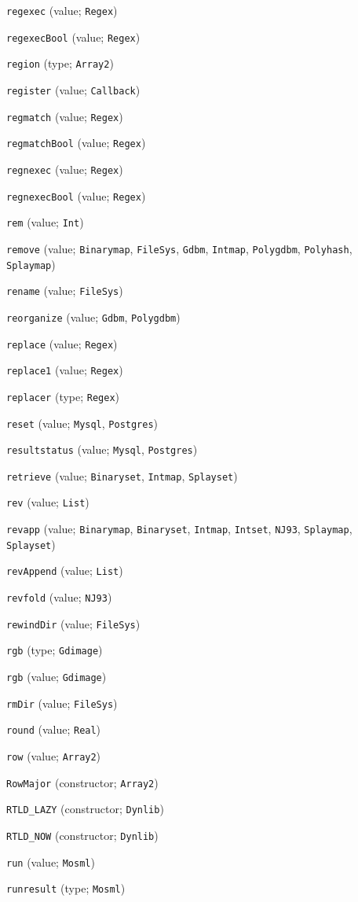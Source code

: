 \begin{description}
\item[] \verb"regexec" (value; \verb"Regex")
\item[] \verb"regexecBool" (value; \verb"Regex")
\item[] \verb"region" (type; \verb"Array2")
\item[] \verb"register" (value; \verb"Callback")
\item[] \verb"regmatch" (value; \verb"Regex")
\item[] \verb"regmatchBool" (value; \verb"Regex")
\item[] \verb"regnexec" (value; \verb"Regex")
\item[] \verb"regnexecBool" (value; \verb"Regex")
\item[] \verb"rem" (value; \verb"Int")
\item[] \verb"remove" (value; \verb"Binarymap", \verb"FileSys", \verb"Gdbm", \verb"Intmap", \verb"Polygdbm", \verb"Polyhash", \verb"Splaymap")
\item[] \verb"rename" (value; \verb"FileSys")
\item[] \verb"reorganize" (value; \verb"Gdbm", \verb"Polygdbm")
\item[] \verb"replace" (value; \verb"Regex")
\item[] \verb"replace1" (value; \verb"Regex")
\item[] \verb"replacer" (type; \verb"Regex")
\item[] \verb"reset" (value; \verb"Mysql", \verb"Postgres")
\item[] \verb"resultstatus" (value; \verb"Mysql", \verb"Postgres")
\item[] \verb"retrieve" (value; \verb"Binaryset", \verb"Intmap", \verb"Splayset")
\item[] \verb"rev" (value; \verb"List")
\item[] \verb"revapp" (value; \verb"Binarymap", \verb"Binaryset", \verb"Intmap", \verb"Intset", \verb"NJ93", \verb"Splaymap", \verb"Splayset")
\item[] \verb"revAppend" (value; \verb"List")
\item[] \verb"revfold" (value; \verb"NJ93")
\item[] \verb"rewindDir" (value; \verb"FileSys")
\item[] \verb"rgb" (type; \verb"Gdimage")
\item[] \verb"rgb" (value; \verb"Gdimage")
\item[] \verb"rmDir" (value; \verb"FileSys")
\item[] \verb"round" (value; \verb"Real")
\item[] \verb"row" (value; \verb"Array2")
\item[] \verb"RowMajor" (constructor; \verb"Array2")
\item[] \verb"RTLD_LAZY" (constructor; \verb"Dynlib")
\item[] \verb"RTLD_NOW" (constructor; \verb"Dynlib")
\item[] \verb"run" (value; \verb"Mosml")
\item[] \verb"runresult" (type; \verb"Mosml")
\\[2ex]


\end{description}

